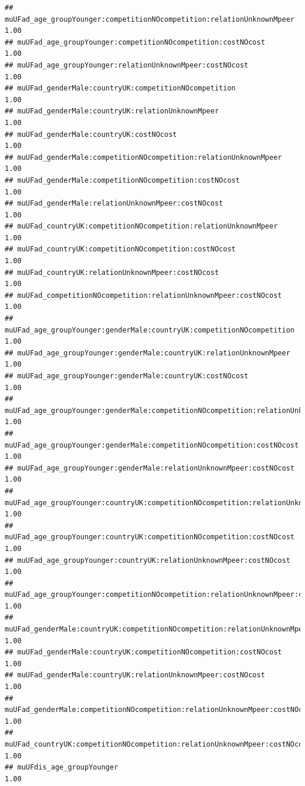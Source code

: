 \documentclass[
]{article}
\begin{document}
\begin{verbatim}
## muUFad_age_groupYounger:competitionNOcompetition:relationUnknownMpeer             1.00
## muUFad_age_groupYounger:competitionNOcompetition:costNOcost                       1.00
## muUFad_age_groupYounger:relationUnknownMpeer:costNOcost                           1.00
## muUFad_genderMale:countryUK:competitionNOcompetition                              1.00
## muUFad_genderMale:countryUK:relationUnknownMpeer                                  1.00
## muUFad_genderMale:countryUK:costNOcost                                            1.00
## muUFad_genderMale:competitionNOcompetition:relationUnknownMpeer                   1.00
## muUFad_genderMale:competitionNOcompetition:costNOcost                             1.00
## muUFad_genderMale:relationUnknownMpeer:costNOcost                                 1.00
## muUFad_countryUK:competitionNOcompetition:relationUnknownMpeer                    1.00
## muUFad_countryUK:competitionNOcompetition:costNOcost                              1.00
## muUFad_countryUK:relationUnknownMpeer:costNOcost                                  1.00
## muUFad_competitionNOcompetition:relationUnknownMpeer:costNOcost                   1.00
## muUFad_age_groupYounger:genderMale:countryUK:competitionNOcompetition             1.00
## muUFad_age_groupYounger:genderMale:countryUK:relationUnknownMpeer                 1.00
## muUFad_age_groupYounger:genderMale:countryUK:costNOcost                           1.00
## muUFad_age_groupYounger:genderMale:competitionNOcompetition:relationUnknownMpeer  1.00
## muUFad_age_groupYounger:genderMale:competitionNOcompetition:costNOcost            1.00
## muUFad_age_groupYounger:genderMale:relationUnknownMpeer:costNOcost                1.00
## muUFad_age_groupYounger:countryUK:competitionNOcompetition:relationUnknownMpeer   1.00
## muUFad_age_groupYounger:countryUK:competitionNOcompetition:costNOcost             1.00
## muUFad_age_groupYounger:countryUK:relationUnknownMpeer:costNOcost                 1.00
## muUFad_age_groupYounger:competitionNOcompetition:relationUnknownMpeer:costNOcost  1.00
## muUFad_genderMale:countryUK:competitionNOcompetition:relationUnknownMpeer         1.00
## muUFad_genderMale:countryUK:competitionNOcompetition:costNOcost                   1.00
## muUFad_genderMale:countryUK:relationUnknownMpeer:costNOcost                       1.00
## muUFad_genderMale:competitionNOcompetition:relationUnknownMpeer:costNOcost        1.00
## muUFad_countryUK:competitionNOcompetition:relationUnknownMpeer:costNOcost         1.00
## muUFdis_age_groupYounger                                                          1.00

\end{verbatim}
\end{document}

